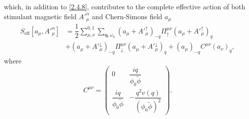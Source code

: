 \documentclass[bachelor,english,numbers]{ustcthesis}
\begin{document}
		which, in addition to \eqref{2.4.8}, contributes to the complete effective action of both stimulant magnetic field ${A'}^\alpha_\mu$ and Chern-Simons field $a_\mu$
		\begin{align}
			S_\text{eff}[a_\mu,{A'}^\alpha_\mu]&=\dfrac{1}{2}\sum_{\mu,\nu}^{0,1}\sum_{\bm{q},\omega_n}\left(a_\mu+{A'}_\mu^\uparrow\right)_{-q}\Pi^{\mu\nu}_\uparrow\left(a_\mu+{A'}_\mu^\uparrow\right)_{q}\nonumber\\
			&+\left(a_\mu+{A'}_\mu^\downarrow\right)_{-q}\Pi^{\mu\nu}_\downarrow\left(a_\mu+{A'}_\mu^\downarrow\right)_{q}+(a_\mu)_{-q}C^{\mu\nu}(a_\nu)_q,\label{2.5.3}
		\end{align}
		where 
		\begin{equation}\label{2.5.4}
			C^{\mu\nu}=\left(\begin{array}{cc}
				0 & \dfrac{iq}{\phi_0\widetilde{\phi} } \\[1.2em]
				\dfrac{iq}{\phi_0\widetilde{\phi} } & -\dfrac{q^2v(q)}{(\phi_0 \widetilde{\phi} )^2}
			\end{array}\right).
		\end{equation}
\end{document}
